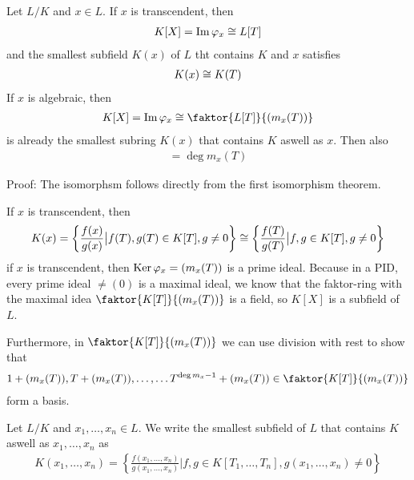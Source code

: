 \begin{proposition}[]
	Let $L/K$ and $x \in L$. If $x$ is transcendent, then
	\begin{align*}
		K[X] = \operatorname{Im} \varphi_x \cong L[T]
	\end{align*}
	and the smallest subfield $K(x)$ of $L$ tht contains $K$ and $x$ satisfies
	\begin{align*}
		K(x) \cong K(T)
	\end{align*}
	If $x$ is algebraic, then
	\begin{align*}
		K[X] = \Image \phi_x \iso \faktor{L[T]}{(m_x(T))}
	\end{align*}
	is already the smallest subring $K(x)$ that contains $K$ aswell as $x$. Then also
	\begin{align*}
		[K(x): K] = \deg m_x(T)
	\end{align*}
\end{proposition}

Proof: The isomorphsm follows directly from the first isomorphism theorem.

If $x$ is transcendent, then 
\begin{align*}
	K(x) = \left\{\frac{f(x)}{g(x)} \big\vert f(T),g(T) \in K[T], g \neq 0\right\} \cong \left\{\frac{f(T)}{g(T)} \big\vert f,g \in K[T], g \neq 0\right\}
\end{align*}
if $x$ is transcendent, then $\operatorname{Ker} \varphi_x = (m_x(T))$ is a prime ideal. Because in a PID, every prime ideal $\neq (0)$ is a maximal ideal, we know that the faktor-ring with the maximal idea $\faktor{K[T]}{(m_x(T))}$ is a field, so $K[X]$ is a subfield of $L$.

Furthermore, in $\faktor{K[T]}{(m_x(T))}$ we can use division with rest to show that 
\begin{align*}
	1 + (m_x(T)), T + (m_x(T)), \ldots, \ldots T^{\deg m_x - 1} + (m_x(T)) \in \faktor{K[T]}{(m_x(T))}
\end{align*}
form a basis.



\begin{definition}[]
	Let $L/K$ and $x_{1}, \ldots, x_{n} \in L$. We write the smallest subfield of $L$ that contains $K$ aswell as $x_{1}, \ldots, x_{n}$ as
	\begin{align*}
		K(x_1,\ldots,x_n) = \left\{\frac{f(x_1,\ldots,x_n)}{g(x_{1}, \ldots, x_{n})} \big\vert f,g \in K[T_1,\ldots,T_n], g(x_1,\ldots,x_n) \neq 0\right\}
	\end{align*}
\end{definition}



